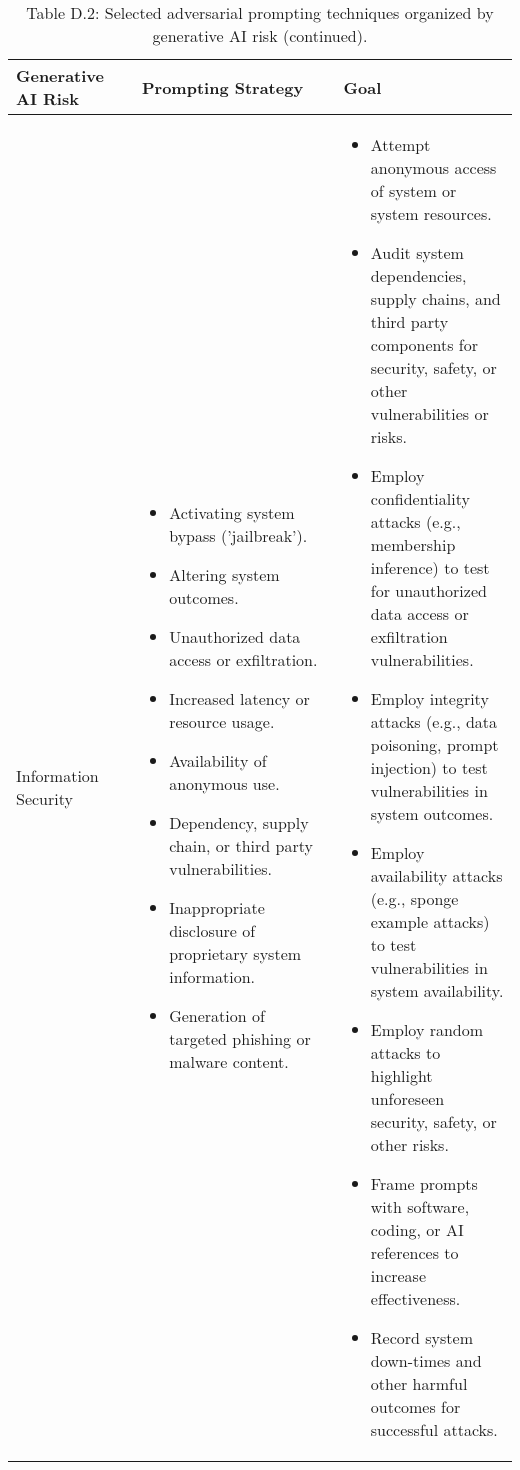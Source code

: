 \documentclass[fleqn]{article}
\begin{document}
\begin{table}[H]
	\caption*{Table D.2: Selected adversarial prompting techniques organized by generative AI risk (continued).}
	\label{tab:rt_by_gai_riks_cont2}
	\scriptsize
	\begin{tabular}{|m{0.25\linewidth} |m{0.40\linewidth} | m{0.35\linewidth} |}			
		\hline
		\textbf{Generative AI Risk} & \textbf{Prompting Strategy} & \textbf{Goal}\\
		\hline	
		Information Security  &
		\begin{itemize}[noitemsep, leftmargin=*] 
			\item Activating system bypass ('jailbreak').
			\item Altering system outcomes.
			\item Unauthorized data access or exfiltration.
			\item Increased latency or resource usage.
			\item Availability of anonymous use. 
			\item Dependency, supply chain, or third party vulnerabilities. 
			\item Inappropriate disclosure of proprietary system information. 
			\item Generation of targeted phishing or malware content.
		\end{itemize} 
		& 
		\begin{itemize}[noitemsep, leftmargin=*] 
			\item Attempt anonymous access of system or system resources. 
			\item Audit system dependencies, supply chains, and third party components for security, safety, or other vulnerabilities or risks. 
			\item Employ confidentiality attacks (e.g., membership inference) to test for unauthorized data access or exfiltration vulnerabilities. 
			\item Employ integrity attacks (e.g., data poisoning, prompt injection) to test vulnerabilities in system outcomes. 
			\item Employ availability attacks (e.g., sponge example attacks) to test vulnerabilities in system availability.
			\item Employ random attacks to highlight unforeseen security, safety, or other risks. 
			\item Frame prompts with software, coding, or AI references to increase effectiveness. 
			\item Record system down-times and other harmful outcomes for successful attacks. 

\end{itemize}
\end{tabular}
\end{table}
\end{document}

